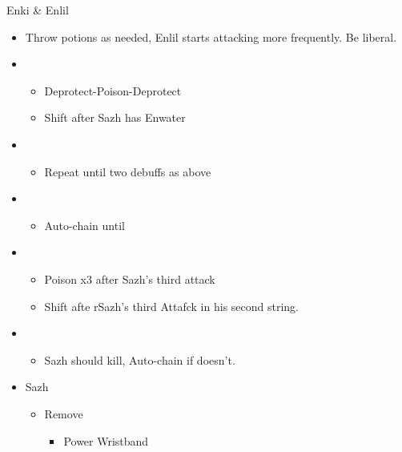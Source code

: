 \begin{paracol}{2}
\begin{battle}{Enki \& Enlil}
\begin{itemize}
\begin{itemize}
    \end{itemize}
    \item Throw potions as needed, Enlil starts attacking more frequently. Be liberal.
    \item \third
    \begin{itemize}
        \item Deprotect-Poison-Deprotect
        \item Shift after Sazh has Enwater
    \end{itemize}
    \item \fifth
    \begin{itemize}
        \item Repeat until two debuffs as above
    \end{itemize}
    \item \fourth
    \begin{itemize}
        \item Auto-chain until \stagger
    \end{itemize}
    \item \sixth
    \begin{itemize}
        \item Poison x3 after Sazh's third attack
        \item Shift afte rSazh's third Attafck in his second string.
    \end{itemize}
    \item \first
    \begin{itemize}
        \item Sazh should kill, Auto-chain if doesn't.
    \end{itemize}
\end{itemize}
\end{battle}
\switchcolumn*
\begin{menu}
	\begin{itemize}
		\equip
		\begin{itemize}
			\item Sazh
			      \begin{itemize}
				      \item Remove
				            \begin{itemize}
					            \item Power Wristband
				            \end{itemize}
			      \end{itemize}
		\end{itemize}
	\end{itemize}
\end{menu}

\end{paracol}

